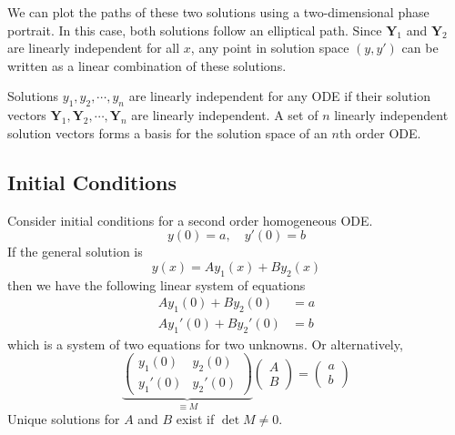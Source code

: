 \documentclass{article}
\begin{document}
	We can plot the paths of these two solutions using a two-dimensional phase portrait. In this case, both solutions follow an elliptical path. Since $\bm Y_1$ and $\bm Y_2$ are linearly independent for all $x$, any point in solution space $(y, y')$ can be written as a linear combination of these solutions. 
	
	Solutions $y_1, y_2, \cdots, y_n$ are linearly independent for any ODE if their solution vectors $\bm Y_1, \bm Y_2, \cdots, \bm Y_n$ are linearly independent. A set of $n$ linearly independent solution vectors forms a basis for the solution space of an $n$th order ODE.
	
	\subsection{Initial Conditions}
	Consider initial conditions for a second order homogeneous ODE.
	\[ y(0) = a,\quad y'(0) = b \]
	If the general solution is
	\[ y(x) = Ay_1(x) + By_2(x) \]
	then we have the following linear system of equations
	\begin{align*}
		Ay_1(0) + By_2(0) &= a \\
		Ay_1'(0) + By_2'(0) &= b
	\end{align*}
	which is a system of two equations for two unknowns. Or alternatively,
	\[
		\underbrace{\begin{pmatrix}
			y_1(0) & y_2(0) \\
			y_1'(0) & y_2'(0)
		\end{pmatrix}}_{\equiv M}
		\begin{pmatrix}
			A \\ B
		\end{pmatrix}
		=
		\begin{pmatrix}
			a \\b 
		\end{pmatrix}
	\]
	Unique solutions for $A$ and $B$ exist if $\det M \neq 0$.
\end{document}
